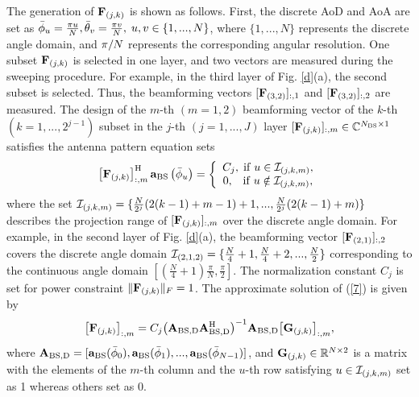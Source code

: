 \documentclass[journal,12pt,onecolumn,draftclsnofoot,]{IEEEtran}
\begin{document}
The generation of ${ {{{\bf{F}}_{({j,k} )}}} }$ is shown as follows. First, the discrete AoD and AoA are set as ${\bar \phi _u} = \frac{{\pi u}}{N},{\bar \theta _v} = \frac{{\pi v}}{N},{\rm{\;}}u,v \in \{ {1, ...,N } \}$, where $\{ {1, ...,N} \}$ represents the discrete angle domain, and ${\rm{\pi }}/N$ represents the corresponding angular resolution.
One subset ${ {{{\bf{F}}_{({j,k} )}}} }$ is selected in one layer, and two vectors are measured during the sweeping procedure. For example, in the third layer of Fig. \ref{d}(a), the second subset is selected. 
Thus, the beamforming vectors ${[ {{{\bf{F}}_{({3,2} )}}} ]_{:,1}}$ and ${[ {{{\bf{F}}_{({3,2} )}}} ]_{:,2}}$ are measured. 
The design of the $m$-th $(m=1,2)$ beamforming vector of the $k$-th $(k=1,...,2^{j-1})$ subset in the $j$-th $(j=1,...,J)$ layer 
${[ {{{\bf{F}}_{({j,k} )}}} ]_{:,m}} \in {\mathbb{C}^{{N_{{\rm BS}}} \times {1}}}$ satisfies the antenna pattern equation sets
\begin{equation}
\label{7}
\left[ {{{\bf{F}}_{\left({j,k} \right)}}} \right]_{:,m}^{\rm H}{{\bf{a}}_{\rm BS}}\left({{{\bar \phi }_u}} \right) = \left\{ {\begin{array}{*{20}{c}}
{{C_j},{\rm{\;if\;}}u \in {{\cal I}_{\left({j,k,m} \right)}}},\\
{0,{\rm{\;\;\;if\;}}u \notin {{\cal I}_{\left({j,k,m} \right)}}},
\end{array}} \right.
\end{equation}
\noindent where the set ${{\cal I}_{({j,k,m} )}} = \{ \frac{N}{{{2^j}}}({2({k - 1} ) + m - 1} ) + 1, ...,
\frac{N}{{{2^j}}} ({2({k - 1} ) + m} ) \}$ describes the projection range of ${[ {{{\bf{F}}_{({j,k} )}}} ]_{:,m}}$ over the discrete angle domain. 
For example, in the second layer of Fig. \ref{d}(a), the beamforming vector ${[ {{{\bf{F}}_{({2,1} )}}} ]_{:,2}}$ covers the discrete angle domain ${{\cal I}_{({2,1,2} )}} =\{\frac{N}{4}+1, \frac{N}{4}+2,..., \frac{N}{2} \}$ corresponding to the continuous angle domain $[ {(\frac{N}{4}+1)\frac{\pi}{N}, \frac{\pi}{2} }]$.
The normalization constant ${C_j}$ is set for power constraint ${\| {{{\bf{F}}_{({j,k} )}}} \|_F} = 1$. The approximate solution of (\ref{7}) is given by \cite{a12}
\begin{equation}
\label{8}
{\left[ {{{\bf{F}}_{\left({j,k} \right)}}} \right]_{:,m}} = {C_j}{\left({{{\bf{A}}_{{\rm{BS,D}}}}{\bf{A}}_{{\rm{BS,D}}}^{\rm H}} \right)^{ - 1}}{{\bf{A}}_{{\rm{BS,D}}}}{\left[ {{{\bf{G}}_{\left({j,k} \right)}}} \right]_{:,m}},
\end{equation}
where ${{\bf{A}}_{{\rm{BS,D}}}} = [ {{{\bf{a}}_{{\rm{BS}}}}({{{\bar \phi }_0}} ),{{\bf{a}}_{{\rm{BS}}}}({{{\bar \phi }_1}} ), ...,{{\bf{a}}_{{\rm{BS}}}}({{{\bar \phi }_{N - 1}}} )} ]$, and ${{\bf{G}}_{({j,k} )}} \in {\mathbb{R}^{N \times {2}}}$ is a matrix with the elements of the $m$-th column and the $u$-th row satisfying $u \in {{\cal I}_{({j,k,m} )}}$ set as 1 whereas others set as 0. 
{}
\end{document}
